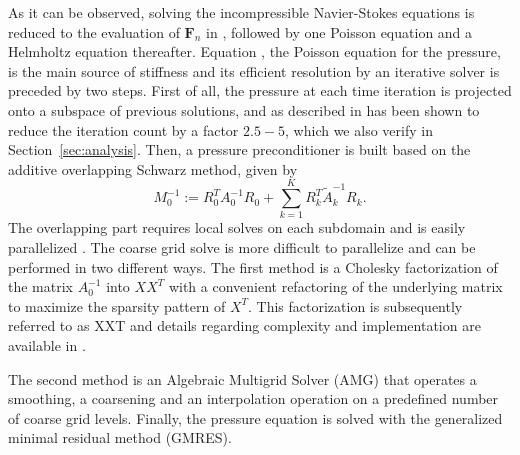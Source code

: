 \documentclass{sig-alternate}
\begin{document}
As it can be observed, solving the incompressible Navier-Stokes equations is reduced to the evaluation of $\mathbf{F}_n$ in , followed by one Poisson equation and a Helmholtz equation thereafter. 
Equation , the Poisson equation for the pressure, is the main source of stiffness and its efficient resolution by an iterative solver is preceded by two steps. First of all, the pressure at each time iteration is projected onto a subspace of previous solutions, and as described in \cite{Fischer1998} has been shown to reduce the iteration count by a factor $2.5-5$, which we also verify in Section~\ref{sec:analysis}. Then, a pressure preconditioner is built based on the additive overlapping Schwarz method, given by 
\begin{equation}
 M_0^{-1} := R_0^T A_{0}^{-1} R_0 + \sum_{k=1}^{K} R_k^T \tilde{A}_k^{-1} R_k.
\end{equation}
The overlapping part requires local solves on each subdomain and is easily parallelized \cite{Fischer199784,Fischer2005}. The coarse grid solve is more difficult to parallelize and can be performed in two different ways. The first method is a Cholesky factorization of the matrix $A_0^{-1}$ into $XX^T$ with a convenient refactoring of the underlying matrix to maximize the sparsity pattern of $X^T$. This factorization is subsequently referred to as XXT and details regarding complexity and implementation are available in \cite{Tufo2001151}. 

The second method is an Algebraic Multigrid Solver (AMG) that operates a smoothing, a coarsening and an interpolation operation on a predefined number of coarse grid levels. Finally, the pressure equation is solved with the generalized minimal residual method (GMRES).
\end{document}
